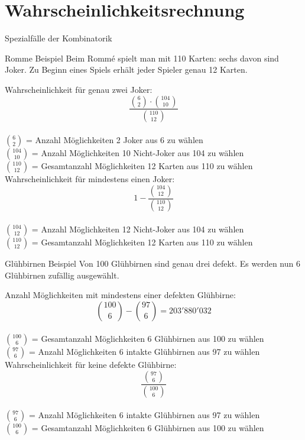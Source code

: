 \section{Wahrscheinlichkeitsrechnung}
\begin{concept}{Spezialfälle der Kombinatorik}
\begin{example}{Romme Beispiel}
Beim Rommé spielt man mit 110 Karten: sechs davon sind Joker. Zu Beginn eines Spiels erhält jeder Spieler genau 12 Karten.

Wahrscheinlichkeit für genau zwei Joker:
$$
\frac{\binom{6}{2} \cdot\binom{104}{10}}{\binom{110}{12}}
$$
\\
$\binom{6}{2}$ = Anzahl Möglichkeiten 2 Joker aus 6 zu wählen\\
$\binom{104}{10}$ = Anzahl Möglichkeiten 10 Nicht-Joker aus 104 zu wählen\\
$\binom{110}{12}$ = Gesamtanzahl Möglichkeiten 12 Karten aus 110 zu wählen\\

Wahrscheinlichkeit für mindestens einen Joker:
$$
1-\frac{\binom{104}{12}}{\binom{110}{12}}
$$
\\
$\binom{104}{12}$ = Anzahl Möglichkeiten 12 Nicht-Joker aus 104 zu wählen\\
$\binom{110}{12}$ = Gesamtanzahl Möglichkeiten 12 Karten aus 110 zu wählen\\
\end{example}

\begin{example}{Glühbirnen Beispiel}
Von 100 Glühbirnen sind genau drei defekt. Es werden nun 6 Glühbirnen zufällig ausgewählt.

Anzahl Möglichkeiten mit mindestens einer defekten Glühbirne:
$$
\binom{100}{6}-\binom{97}{6}=203'880'032
$$
\\
$\binom{100}{6}$ = Gesamtanzahl Möglichkeiten 6 Glühbirnen aus 100 zu wählen\\
$\binom{97}{6}$ = Anzahl Möglichkeiten 6 intakte Glühbirnen aus 97 zu wählen\\

Wahrscheinlichkeit für keine defekte Glühbirne:
$$
\frac{\binom{97}{6}}{\binom{100}{6}}
$$
\\
$\binom{97}{6}$ = Anzahl Möglichkeiten 6 intakte Glühbirnen aus 97 zu wählen\\
$\binom{100}{6}$ = Gesamtanzahl Möglichkeiten 6 Glühbirnen aus 100 zu wählen\\
\end{example}
\end{concept}

